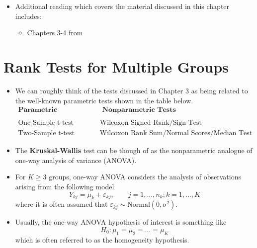 \documentclass[]{book}
\providecommand{\tightlist}{%
  \setlength{\itemsep}{0pt}\setlength{\parskip}{0pt}}
\begin{document}
\begin{itemize}
\tightlist
\item
  Additional reading which covers the material discussed in this chapter includes:

  \begin{itemize}
  \tightlist
  \item
    Chapters 3-4 from \citet{hollander2013}
  \end{itemize}
\end{itemize}

\hypertarget{krusk-wallis}{%
\chapter{Rank Tests for Multiple Groups}\label{krusk-wallis}}

\begin{itemize}
\item
  We can roughly think of the tests discussed in Chapter 3
  as being related to the well-known parametric tests shown in the table below.
  \begin{eqnarray}
  \textbf{Parametric Test} & & \qquad  \textbf{ Nonparametric Tests } \nonumber \\
      & & \nonumber \\
  \textrm{One-Sample t-test} & & \qquad  \textrm{Wilcoxon Signed Rank/Sign Test} \nonumber \\
  \textrm{Two-Sample t-test} & & \qquad \textrm{Wilcoxon Rank Sum/Normal Scores/Median Test} \nonumber
  \end{eqnarray}
\item
  The \textbf{Kruskal-Wallis} test can be though of as the
  nonparametric analogue of one-way analysis of variance (ANOVA).
\item
  For \(K \geq 3\) groups, one-way ANOVA considers the analysis of observations
  arising from the following model
  \begin{equation}
  Y_{kj} = \mu_{k} + \varepsilon_{kj}, \qquad j=1,\ldots, n_{k}; k=1,\ldots,K  
  \label{eq:normal-anova-model}
  \end{equation}
  where it is often assumed that \(\varepsilon_{kj} \sim \textrm{Normal}(0, \sigma^{2})\).
\item
  Usually, the one-way ANOVA hypothesis of interest is something like
  \begin{equation}
  H_{0}: \mu_{1} = \mu_{2} = \ldots = \mu_{K}
  \label{eq:homogeneity-hyp}
  \end{equation}
  which is often referred to as the homogeneity hypothesis.

\end{itemize}
\end{document}
